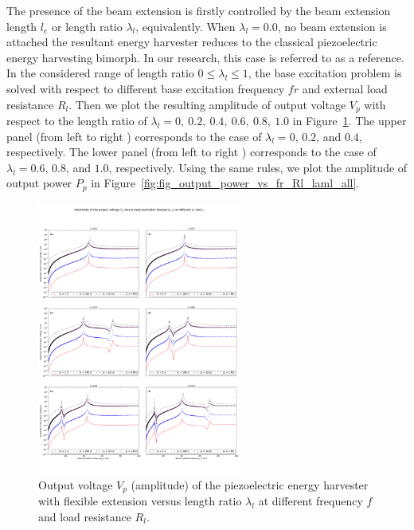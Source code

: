 \documentclass{elsarticle}
\begin{document}
The presence of the beam extension is firstly controlled by the beam extension length $l_e$ or length ratio $\lambda_l$, equivalently. When $\lambda_l = 0.0$, no beam extension is attached the resultant energy harvester reduces to the classical piezoelectric energy harvesting bimorph. \cite{erturk2009experimentally} In our research, this case is referred to as a reference. In the considered range of length ratio $0 \leq \lambda_l \leq 1$, the base excitation problem is solved with respect to different base excitation frequency $fr$ and external load resistance $R_l$. Then we plot the resulting amplitude of output voltage $V_p$ with respect to the length ratio of $\lambda_l = 0,\ 0.2,\ 0.4,\ 0.6,\ 0.8,\ 1.0$ in Figure~\ref{fig:fig_output_voltage_vs_fr_Rl_laml_all}. The upper panel (from left to right ) corresponds to the case of $\lambda_l =0$, $0.2$, and $0.4$, respectively. The lower panel (from left to right ) corresponds to the case of $\lambda_l =0.6$, $0.8$, and $1.0$, respectively. Using the same rules, we plot the amplitude of output power $P_p$ in  Figure~\ref{fig:fig_output_power_vs_fr_Rl_laml_all}.

\begin{figure}[!htbp]
    \centering
    \includegraphics[width=0.6\textwidth]{./fig_output_voltage_vs_fr_Rl_laml_all}
    \caption{Output voltage $V_p$ (amplitude) of the piezoelectric energy harvester with flexible extension versus length ratio $\lambda_l$ at different frequency $f$ and load resistance $R_l$. }
    \label{fig:fig_output_voltage_vs_fr_Rl_laml_all}
\end{figure}
\end{document}
